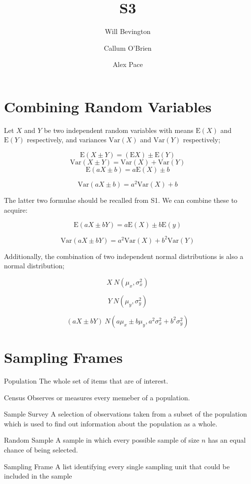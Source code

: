 \documentclass{article}
\begin{document}
\title{S3} \author{Will Bevington \and Callum O'Brien \and Alex Pace} \maketitle
\tableofcontents

\newpage

\section{Combining Random Variables}

Let $X$ and $Y$ be two independent random variables with means $\textrm{E}(X)$
and $\textrm{E}(Y)$ respectively, and variances $\textrm{Var}(X)$ and
$\textrm{Var}(Y)$ respectively;

\[\textrm{E}(X\pm Y)=(\textrm{E}X)\pm\textrm{E}(Y)\] \[\textrm{Var}(X\pm
Y)=\textrm{Var}(X)+\textrm{Var}(Y)\] \[\textrm{E}(aX\pm b)=a\textrm{E}(X)\pm b\]

\[\textrm{Var}(aX\pm b)=a^2\textrm{Var}(X)+b\]

\noindent The latter two formulae should be recalled from S1. We can combine
these to acquire:

\[\textrm{E}(aX\pm bY) = a\textrm{E}(X)\pm b\textrm{E}(y)\] 

\[\textrm{Var}(aX\pm
bY) = a^2\textrm{Var}(X)+b^2\textrm{Var}(Y)\]

\noindent Additionally, the combination of two independent normal distributions
is also a normal distribution;

\[X~N(\mu_x,\sigma_x^2)\] 

\[Y~N(\mu_y,\sigma_y^2)\] 

\[(aX\pm bY)~N(a\mu_x\pm
b\mu_y,a^2\sigma_x^2+b^2\sigma_y^2)\]

\section{Sampling Frames}

\begin{description}
    
    \item{Population} The whole set of items that are of interest.
    \item{Census} Observes or measures every memeber of a population.
    \item{Sample Survey} A selection of observations taken from a subset of the
        population which is used to find out information about the population as
        a whole.
    \item{Random Sample} A sample in which every possible sample of size $n$ has
        an equal chance of being selected.  
    \item{Sampling Frame} A list identifying every single sampling unit that
        could be included in the sample

\end{description}
\end{document}

